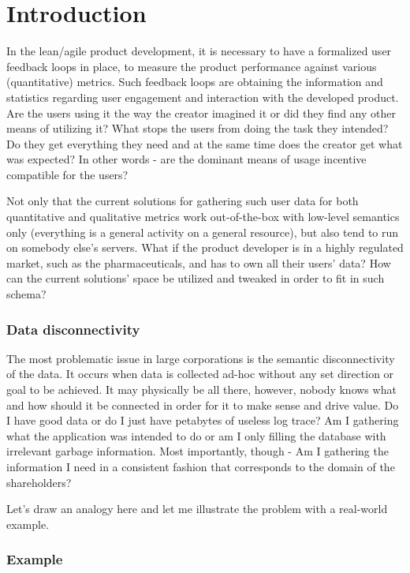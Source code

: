 \chapter{Introduction}

In the lean/agile product development, it is necessary to have a formalized user feedback loops in place, to measure the product performance against various (quantitative) metrics. Such feedback loops are obtaining the information and statistics regarding user engagement and interaction with the developed product. Are the users using it the way the creator imagined it or did they find any other means of utilizing it? What stops the users from doing the task they intended? Do they get everything they need and at the same time does the creator get what was expected? In other words - are the dominant means of usage incentive compatible for the users? 

Not only that the current solutions for gathering such user data for both quantitative and qualitative metrics work out-of-the-box with low-level semantics only (everything is a general activity on a general resource), but also tend to run on somebody else's servers. What if the product developer is in a highly regulated market, such as the pharmaceuticals, and has to own all their users' data? How can the current solutions' space be utilized and tweaked in order to fit in such schema?

\subsection*{Data disconnectivity}

The most problematic issue in large corporations is the semantic disconnectivity of the data. It occurs when data is collected ad-hoc without any set direction or goal to be achieved. It may physically be all there, however, nobody knows what and how should it be connected in order for it to make sense and drive value. Do I have good data or do I just have petabytes of useless log trace? Am I gathering what the application was intended to do or am I only filling the database with irrelevant garbage information. Most importantly, though - Am I gathering the information I need in a consistent fashion that corresponds to the domain of the shareholders?

Let's draw an analogy here and let me illustrate the problem with a real-world example.

\newpage

\subsection{Example}

